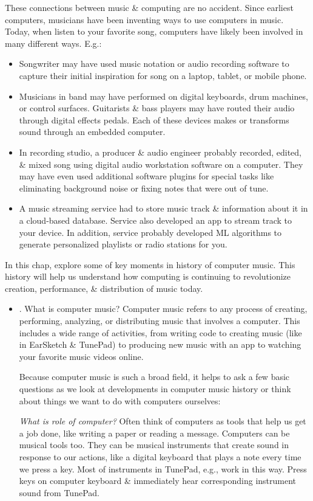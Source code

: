 \documentclass{article}
\begin{document}
\begin{itemize}
	These connections between music \& computing are no accident. Since earliest computers, musicians have been inventing ways to use computers in music. Today, when listen to your favorite song, computers have likely been involved in many different ways. E.g.:
	\begin{itemize}
		\item Songwriter may have used music notation or audio recording software to capture their initial inspiration for song on a laptop, tablet, or mobile phone.
		\item Musicians in band may have performed on digital keyboards, drum machines, or control surfaces. Guitarists \& bass players may have routed their audio through digital effects pedals. Each of these devices makes or transforms sound through an embedded computer.
		\item In recording studio, a producer \& audio engineer probably recorded, edited, \& mixed song using digital audio workstation software on a computer. They may have even used additional software plugins for special tasks like eliminating background noise or fixing notes that were out of tune.
		\item A music streaming service had to store music track \& information about it in a cloud-based database. Service also developed an app to stream track to your device. In addition, service probably developed ML algorithms to generate personalized playlists or radio stations for you.
	\end{itemize}
	In this chap, explore some of key moments in history of computer music. This history will help us understand how computing is continuing to revolutionize creation, performance, \& distribution of music today.
	\begin{itemize}
		\item {. What is computer music?} Computer music refers to any process of creating, performing, analyzing, or distributing music that involves a computer. This includes a wide range of activities, from writing code to creating music (like in EarSketch \& TunePad) to  producing new music with an app to watching your favorite music videos online.
		
		Because computer music is such a broad field, it helps to ask a few basic questions as we look at developments in computer music history or think about things we want to do with computers ourselves:
		
		{\it What is role of computer?} Often think of computers as tools that help us get a job done, like writing a paper or reading a message. Computers can be musical tools too. They can be musical instruments that create sound in response to our actions, like a digital keyboard that plays a note every time we press a key. Most of instruments in TunePad, e.g., work in this way. Press keys on computer keyboard \& immediately hear corresponding instrument sound from TunePad.
		

\end{itemize}
\end{itemize}
\end{document}
